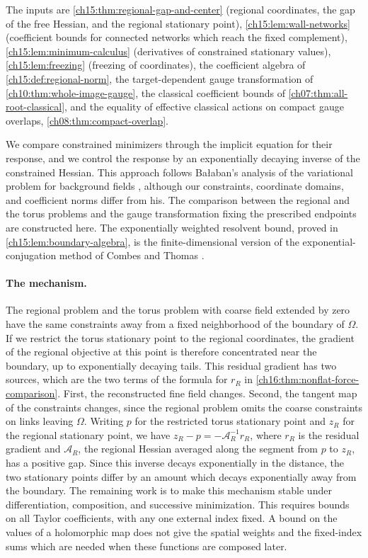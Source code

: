 The inputs are \cref{ch15:thm:regional-gap-and-center} (regional coordinates, the gap of the free Hessian, and the regional stationary point), \cref{ch15:lem:wall-networks} (coefficient bounds for connected networks which reach the fixed complement), \cref{ch15:lem:minimum-calculus} (derivatives of constrained stationary values), \cref{ch15:lem:freezing} (freezing of coordinates), the coefficient algebra of \cref{ch15:def:regional-norm}, the target-dependent gauge transformation of \cref{ch10:thm:whole-image-gauge}, the classical coefficient bounds of \cref{ch07:thm:all-root-classical}, and the equality of effective classical actions on compact gauge overlaps, \cref{ch08:thm:compact-overlap}.

We compare constrained minimizers through the implicit equation for their response, and we control the response by an exponentially decaying inverse of the constrained Hessian. This approach follows Ba\l aban's analysis of the variational problem for background fields \cite[(182)--(190), pp.~307--308, and Proposition~9, p.~309]{Balaban1985Variational}, although our constraints, coordinate domains, and coefficient norms differ from his. The comparison between the regional and the torus problems and the gauge transformation fixing the prescribed endpoints are constructed here. The exponentially weighted resolvent bound, proved in \cref{ch15:lem:boundary-algebra}, is the finite-dimensional version of the exponential-conjugation method of Combes and Thomas \cite{CombesThomas1973}.

\paragraph{The mechanism.}
The regional problem and the torus problem with coarse field extended by zero have the same constraints away from a fixed neighborhood of the boundary of $\Omega$. If we restrict the torus stationary point to the regional coordinates, the gradient of the regional objective at this point is therefore concentrated near the boundary, up to exponentially decaying tails. This residual gradient has two sources, which are the two terms of the formula for $r_R$ in \cref{ch16:thm:nonflat-force-comparison}. First, the reconstructed fine field changes. Second, the tangent map of the constraints changes, since the regional problem omits the coarse constraints on links leaving $\Omega$. Writing $p$ for the restricted torus stationary point and $z_R$ for the regional stationary point, we have $z_R-p=-\mathcal A_R^{-1}r_R$, where $r_R$ is the residual gradient and $\mathcal A_R$, the regional Hessian averaged along the segment from $p$ to $z_R$, has a positive gap. Since this inverse decays exponentially in the distance, the two stationary points differ by an amount which decays exponentially away from the boundary.
The remaining work is to make this mechanism stable under differentiation, composition, and successive minimization. This requires bounds on all Taylor coefficients, with any one external index fixed. A bound on the values of a holomorphic map does not give the spatial weights and the fixed-index sums which are needed when these functions are composed later.

